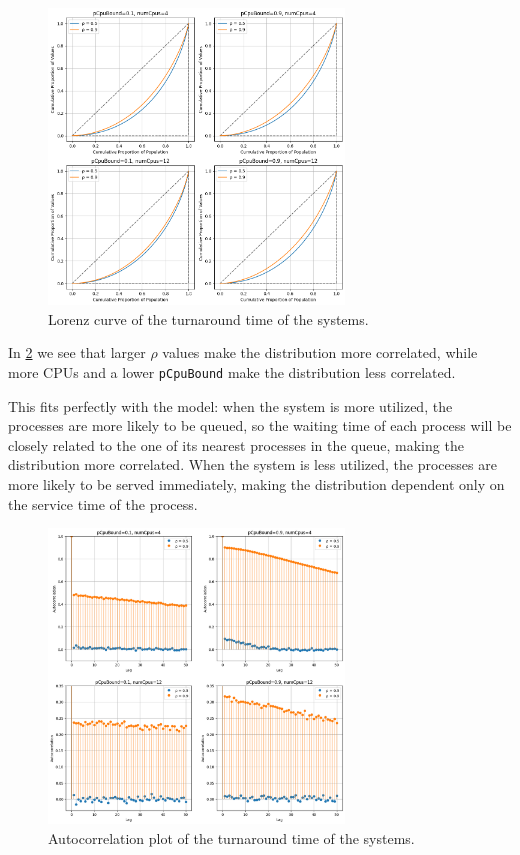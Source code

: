 \begin{figure}[H]
    \captionsetup{type=figure}
    \centering
    \includegraphics[width=0.7\textwidth]{./images/04/fcfs/turn/lorenz.png}
    \caption{Lorenz curve of the turnaround time of the systems.}
    \label{fig:fcfsTurnLorenz}
\end{figure}

In \cref{fig:fcfsTurnAutocorrelation} we see 
that larger $\rho$ values make the distribution more correlated, while more 
CPUs and a lower \texttt{pCpuBound} make the distribution less correlated.

This fits perfectly with the model: when the system is more utilized, the
processes are more likely to be queued, so the waiting time of
each process will be closely related to the one of its nearest 
processes in the queue, making the distribution
more correlated. When the system is less utilized, the processes are more likely
to be served immediately, making the distribution dependent only on the service
time of the process.

\begin{figure}[H]
    \captionsetup{type=figure}
    \centering
    \includegraphics[width=0.7\textwidth]{./images/04/fcfs/turn/autocorrelation.png}
    \caption{Autocorrelation plot of the turnaround time of the systems.}
    \label{fig:fcfsTurnAutocorrelation}
\end{figure}

